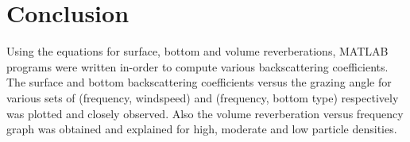 \chapter{Conclusion} \label{Conclusion}

\noindent Using the equations for surface, bottom and volume reverberations, MATLAB programs were written in-order to compute various backscattering coefficients. The surface and bottom backscattering coefficients versus the grazing angle for various sets of (frequency, windspeed) and (frequency, bottom type) respectively was plotted and closely observed. Also the volume reverberation versus frequency graph was obtained and explained for high, moderate and low particle densities.
